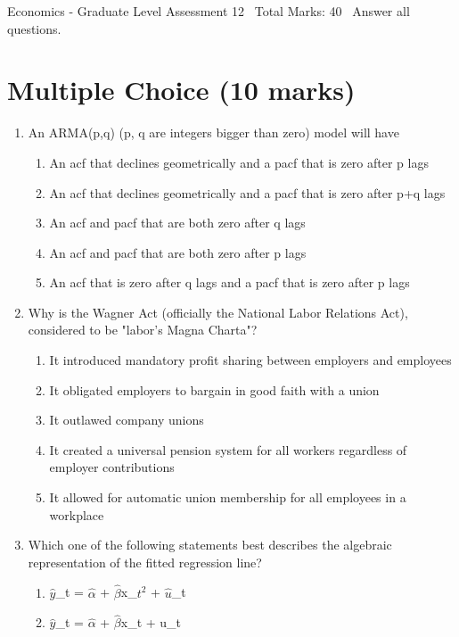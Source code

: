 \documentclass[12pt]{article}
\begin{document}
\begin{center}
Economics - Graduate Level Assessment 12 \
Total Marks: 40 \
Answer all questions.
\end{center}

\section*{Multiple Choice (10 marks)}
\begin{enumerate}[label=\arabic*.]
\item An ARMA(p,q) (p, q are integers bigger than zero) model will have
\begin{enumerate}[label=(\alph*)]
    \item An acf that declines geometrically and a pacf that is zero after p lags
    \item An acf that declines geometrically and a pacf that is zero after p+q lags
    \item An acf and pacf that are both zero after q lags
    \item An acf and pacf that are both zero after p lags
    \item An acf that is zero after q lags and a pacf that is zero after p lags
\end{enumerate}
\item Why is the Wagner Act (officially the National Labor Relations Act), considered to be "labor's Magna Charta"?
\begin{enumerate}[label=(\alph*)]
    \item It introduced mandatory profit sharing between employers and employees
    \item It obligated employers to bargain in good faith with a union
    \item It outlawed company unions
    \item It created a universal pension system for all workers regardless of employer contributions
    \item It allowed for automatic union membership for all employees in a workplace
\end{enumerate}
\item Which one of the following statements best describes the algebraic representation of the fitted regression line?
\begin{enumerate}[label=(\alph*)]
    \item \ensuremath{\hat{y}}\_t = \ensuremath{\hat{\alpha}} + \ensuremath{\hat{\beta}}x\_$t^2$ + \ensuremath{\hat{u}}\_t
    \item \ensuremath{\hat{y}}\_t = \ensuremath{\hat{\alpha}} + \ensuremath{\hat{\beta}}x\_t + u\_t

\end{enumerate}
\end{enumerate}
\end{document}
